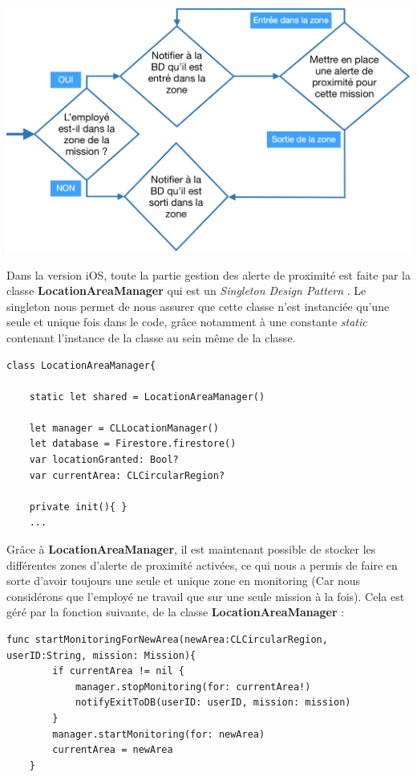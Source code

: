 \documentclass{article}
\begin{document}
\newpage

\begin{center}
  \includegraphics[scale=0.4]{geolocalisationProcess.png}
\end{center}

Dans la version iOS, toute la partie gestion des alerte de proximité est faite par la classe \textbf{LocationAreaManager} qui est un \textit{Singleton Design Pattern} \cite{Singleton}. Le singleton nous permet de nous assurer que cette classe n'est instanciée qu'une seule et unique fois dans le code, grâce notamment à une constante \textit{static} contenant l'instance de la classe au sein même de la classe.

\begin{verbatim}
class LocationAreaManager{
    
    static let shared = LocationAreaManager()
    
    let manager = CLLocationManager()
    let database = Firestore.firestore()
    var locationGranted: Bool?
    var currentArea: CLCircularRegion?
    
    private init(){ }
    ...
\end{verbatim}


Grâce à \textbf{LocationAreaManager}, il est maintenant possible de stocker les différentes zones d'alerte de proximité activées, ce qui nous a permis de faire en sorte d'avoir toujours une seule et unique zone en monitoring (Car nous considérons que l'employé ne travail que sur une seule mission à la fois). Cela est géré par la fonction suivante, de la classe \textbf{LocationAreaManager} :

\begin{verbatim}
func startMonitoringForNewArea(newArea:CLCircularRegion, userID:String, mission: Mission){
        if currentArea != nil {
            manager.stopMonitoring(for: currentArea!)
            notifyExitToDB(userID: userID, mission: mission)
        }
        manager.startMonitoring(for: newArea)
        currentArea = newArea
    }
\end{verbatim}
\end{document}
